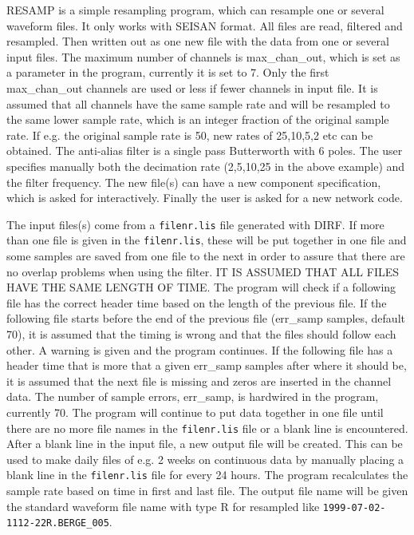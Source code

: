 RESAMP is a simple resampling program, which can resample one or several waveform files. It only works with SEISAN format. All files are read, filtered and resampled. Then written out as one new file with the data from one or several input files. The maximum number of channels is max\_chan\_out, which is set as a parameter in the program, currently it is set to 7. Only the first max\_chan\_out channels are used or less if fewer channels in input file. It is assumed that all channels have the same sample rate and will be resampled to the same lower sample rate, which is an integer fraction of the original sample rate. If e.g. the original sample rate is 50, new rates of 25,10,5,2 etc can be obtained. The anti-alias filter is a single pass Butterworth with 6 poles. The user specifies manually both the decimation rate (2,5,10,25 in the above example) and the filter frequency. The new file(s) can have a new component specification, which is asked for interactively. Finally the user is asked for a new network code. 

The input files(s) come from a \texttt{filenr.lis} file generated with DIRF. If more than one file is given in the \texttt{filenr.lis}, these will be put together in one file and some samples are saved from one file to the next in order to assure that there are no overlap problems when using the filter. IT IS ASSUMED THAT ALL FILES HAVE THE SAME LENGTH OF TIME. The program will check if a following file has the correct header time based on the length of the previous file. If the following file starts before the end of the previous file (err\_samp samples, default 70), it is assumed that the timing is wrong and that the files should follow each other. A warning is given and the program continues. If the following file has a header time that is more that a given err\_samp samples after where it should be, it is assumed that the next file is missing and zeros are inserted in the channel data. The number of sample errors, err\_samp, is hardwired in the program, currently 70. The program will continue to put data together in one file until there are no more file names in the \texttt{filenr.lis} file or a blank line is encountered. After a blank line in the input file, a new output file will be created. This can be used to make daily files of e.g. 2 weeks on continuous data by manually placing a blank line in the \texttt{filenr.lis} file for every 24 hours. The program recalculates the sample rate based on time in first and last file. The output file name will be given the standard waveform file name with type R for resampled like \texttt{1999-07-02-1112-22R.BERGE\_005}. 

